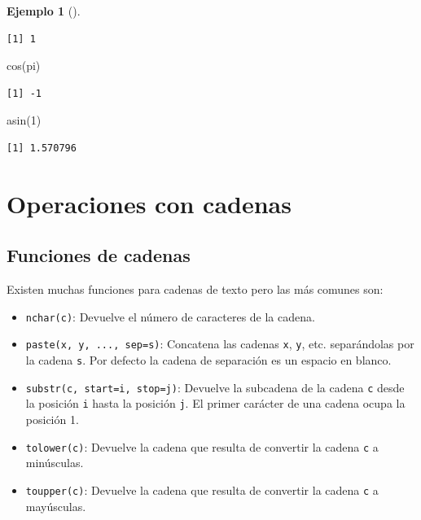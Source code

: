 \documentclass[
  a4paper,
]{scrreport}
\newenvironment{Shaded}{\begin{snugshade}}{\end{snugshade}}
\newcommand{\DecValTok}[1]{\textcolor[rgb]{0.68,0.00,0.00}{#1}}
\newcommand{\FunctionTok}[1]{\textcolor[rgb]{0.28,0.35,0.67}{#1}}
\newcommand{\NormalTok}[1]{\textcolor[rgb]{0.00,0.23,0.31}{#1}}
\providecommand{\tightlist}{%
  \setlength{\itemsep}{0pt}\setlength{\parskip}{0pt}}\usepackage{longtable,booktabs,array}
\theoremstyle{definition}
\theoremstyle{definition}
\newtheorem{example}{Ejemplo}[chapter]
\theoremstyle{remark}
\begin{document}
\begin{example}[]
\begin{verbatim}
[1] 1
\end{verbatim}

\begin{Shaded}
\begin{Highlighting}[]
\FunctionTok{cos}\NormalTok{(pi)}
\end{Highlighting}
\end{Shaded}

\begin{verbatim}
[1] -1
\end{verbatim}

\begin{Shaded}
\begin{Highlighting}[]
\FunctionTok{asin}\NormalTok{(}\DecValTok{1}\NormalTok{)}
\end{Highlighting}
\end{Shaded}

\begin{verbatim}
[1] 1.570796
\end{verbatim}

\end{example}

\section{Operaciones con cadenas}\label{operaciones-con-cadenas}

\subsection{Funciones de cadenas}\label{funciones-de-cadenas}

Existen muchas funciones para cadenas de texto pero las más comunes son:

\begin{itemize}
\tightlist
\item
  \texttt{nchar(c)}: Devuelve el número de caracteres de la cadena.
\item
  \texttt{paste(x,\ y,\ ...,\ sep=s)}: Concatena las cadenas \texttt{x},
  \texttt{y}, etc. separándolas por la cadena \texttt{s}. Por defecto la
  cadena de separación es un espacio en blanco.
\item
  \texttt{substr(c,\ start=i,\ stop=j)}: Devuelve la subcadena de la
  cadena \texttt{c} desde la posición \texttt{i} hasta la posición
  \texttt{j}. El primer carácter de una cadena ocupa la posición 1.
\item
  \texttt{tolower(c)}: Devuelve la cadena que resulta de convertir la
  cadena \texttt{c} a minúsculas.
\item
  \texttt{toupper(c)}: Devuelve la cadena que resulta de convertir la
  cadena \texttt{c} a mayúsculas.
\end{itemize}
\end{document}
